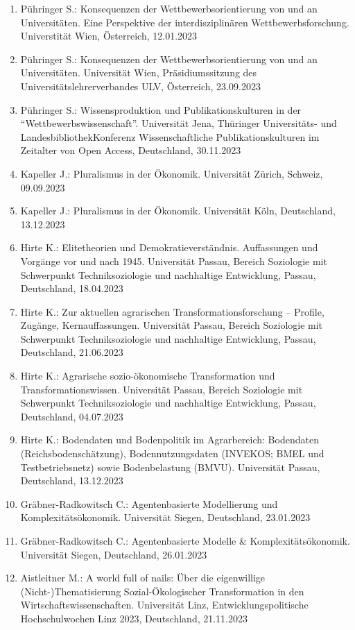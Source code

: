 \begin{enumerate}
	\item Pühringer S.: Konsequenzen der Wettbewerbsorientierung von und an Universitäten. Eine Perspektive der interdisziplinären Wettbewerbsforschung. Universtität Wien, Österreich, 12.01.2023
	\item Pühringer S.: Konsequenzen der Wettbewerbsorientierung von und an Universitäten. Universität Wien, Präsidiumssitzung des Universitätslehrerverbandes ULV, Österreich, 23.09.2023
	\item Pühringer S.: Wissensproduktion und Publikationskulturen in der “Wettbewerbswissenschaft”. Universität Jena, Thüringer Universitäts- und LandesbibliothekKonferenz Wissenschaftliche Publikationskulturen im Zeitalter von Open Access, Deutschland, 30.11.2023
	\item Kapeller J.: Pluralismus in der Ökonomik. Universität Zürich, Schweiz, 09.09.2023
	\item Kapeller J.: Pluralismus in der Ökonomik. Universität Köln, Deutschland, 13.12.2023
	\item Hirte K.: Elitetheorien und Demokratieverständnis. Auffassungen und Vorgänge vor und nach 1945. Universität Passau, Bereich Soziologie mit Schwerpunkt Techniksoziologie und nachhaltige Entwicklung, Passau, Deutschland, 18.04.2023
	\item Hirte K.: Zur aktuellen agrarischen Transformationsforschung – Profile, Zugänge, Kernauffassungen. Universität Passau, Bereich Soziologie mit Schwerpunkt Techniksoziologie und nachhaltige Entwicklung, Passau, Deutschland, 21.06.2023
	\item Hirte K.: Agrarische sozio-ökonomische Transformation und Transformationswissen. Universität Passau, Bereich Soziologie mit Schwerpunkt Techniksoziologie und nachhaltige Entwicklung, Passau, Deutschland, 04.07.2023
	\item Hirte K.: Bodendaten und Bodenpolitik im Agrarbereich: Bodendaten (Reichsbodenschätzung), Bodennutzungsdaten (INVEKOS; BMEL und Testbetriebsnetz) sowie Bodenbelastung (BMVU). Universität Passau, Deutschland, 13.12.2023
	\item Gräbner-Radkowitsch C.: Agentenbasierte Modellierung und Komplexitätsökonomik. Universität Siegen, Deutschland, 23.01.2023
	\item Gräbner-Radkowitsch C.: Agentenbasierte Modelle \& Komplexitätsökonomik. Universität Siegen, Deutschland, 26.01.2023
	\item Aistleitner M.: A world full of nails: Über die eigenwillige (Nicht-)Thematisierung Sozial-Ökologischer Transformation in den Wirtschaftswissenschaften. Universität Linz, Entwicklungspolitische Hochschulwochen Linz 2023, Deutschland, 21.11.2023
\end{enumerate}


